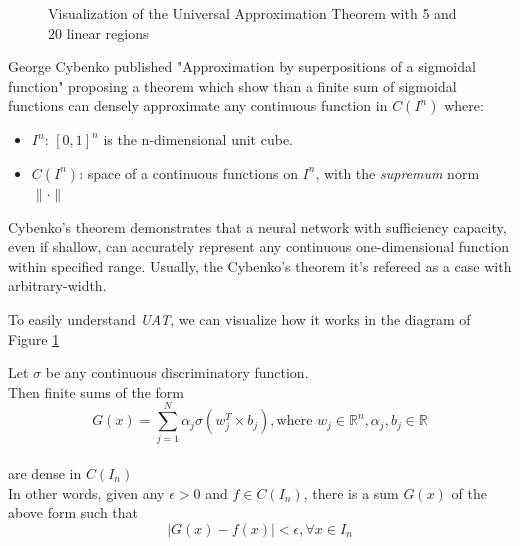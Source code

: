 \documentclass{article}
\begin{document}
\begin{figure}[h]
\caption{Visualization of the Universal Approximation Theorem with 5 and 20 linear regions}
\label{fig:UAT}
\end{figure}

George Cybenko published "Approximation by superpositions of a sigmoidal function" proposing a theorem which show than a finite sum of sigmoidal functions can densely approximate any continuous function in $C(I^n)$ where:
\begin{itemize}
    \item $I^n$: $[0,1]^n$ is the n-dimensional unit cube.
    \item $C(I^n)$: space of a continuous functions on $I^n$, with the \textit{supremum} norm $\| \cdot \|$
\end{itemize}

Cybenko's theorem demonstrates that a neural network with sufficiency capacity, even if shallow, can accurately represent any continuous one-dimensional function within specified range. Usually, the Cybenko's theorem it's refereed as a case with arbitrary-width.

To easily understand \textit{UAT}, we can visualize how it works in the diagram of Figure \ref{fig:UAT}

\begin{algorithm}[h]
    \caption{Cybenko's Theorem}
        Let $\sigma$ be any continuous discriminatory function. \\
        Then finite sums of the form \\
        \begin{equation*}
            G(x) = \sum_{j=1}^N \alpha_j \sigma(w_j^T \times b_j), \text{where } w_j \in \mathbb{R}^n, \alpha_j, b_j \in \mathbb{R}
        \end{equation*} \\
        are dense in $C(I_n)$ \\
        In other words, given any $\epsilon  > 0$ and $f \in C(I_n)$, there is a sum $G(x)$ of the above form such that \\
        \begin{equation*}
            |G(x) - f(x)| < \epsilon, \forall x \in I_n
        \end{equation*}

\end{algorithm}
\end{document}
